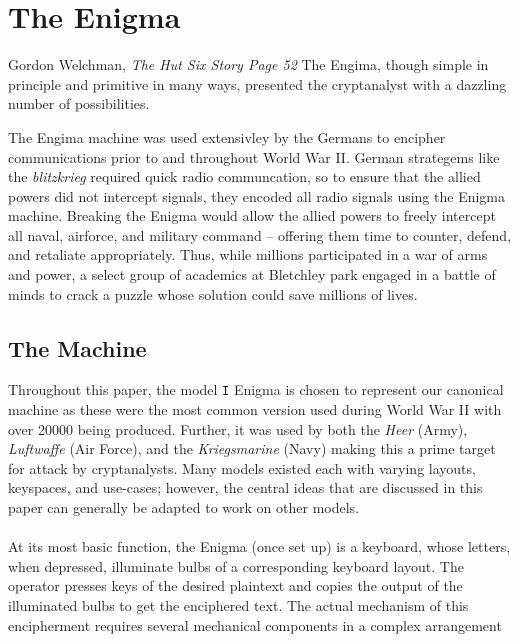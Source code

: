 \chapter{The Enigma}

\begin{chapquote}{Gordon Welchman, \textit{The Hut Six Story Page 52}}
  The Engima, though simple in principle and primitive in many ways,
  presented the cryptanalyst with a dazzling number of possibilities.
\end{chapquote}

The Engima machine was used extensivley by the Germans to encipher
communications prior to and throughout World War II. German
strategems like the \emph{blitzkrieg} required quick radio
communcation, so to ensure that the allied powers did not intercept
signals, they encoded all radio signals using the Enigma machine.
Breaking the Enigma would allow the allied powers to freely intercept
all naval, airforce, and military command -- offering them time to
counter, defend, and retaliate appropriately. Thus, while millions
participated in a war of arms and power, a select group of academics
at Bletchley park engaged in a battle of minds to crack a puzzle
whose solution could save millions of lives.

\section{The Machine}
Throughout this paper, the model \texttt{I} Enigma is chosen to
represent our canonical machine as these were the most common version
used during World War II with over 20000 being produced. Further, it
was used by both the \emph{Heer} (Army), \emph{Luftwaffe} (Air
Force), and the \emph{Kriegsmarine} (Navy) making this a prime target
for attack by cryptanalysts. Many models existed each with varying
layouts, keyspaces, and use-cases; however, the central ideas that
are discussed in this paper can generally be adapted to work on other models.
\\\\At its most basic function, the Enigma (once set up) is a
keyboard, whose letters, when depressed, illuminate bulbs of a
corresponding keyboard layout. The operator presses keys of the
desired plaintext and copies the output of the illuminated bulbs to
get the enciphered text. The actual mechanism of this encipherment
requires several mechanical components in a complex arrangement
